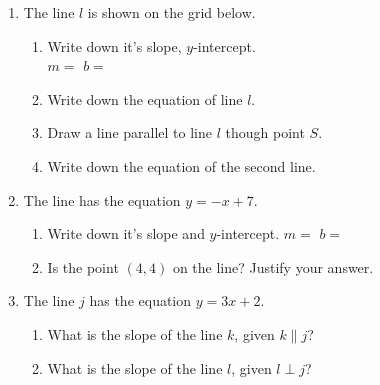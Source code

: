 \begin{enumerate}
\item The line $l$ is shown on the grid below.
\begin{multicols}{2}
\begin{enumerate}
  \item Write down it's slope, $y$-intercept.\\ $m=$
  \hspace{2cm} $b=$
  \vspace{0.25cm}
  \item Write down the equation of line $l$.
  \vspace{1cm}
  \item Draw a line parallel to line $l$ though point $S$.
  \item Write down the equation of the second line.
\end{enumerate}
  \begin{center}
  \end{center}
\end{multicols}\vspace{0.5cm}

\item The line has the equation $y=-x+7$. 
\begin{enumerate}
  \item Write down it's slope and $y$-intercept. \hspace{2cm} $m=$
  \hspace{2cm} $b=$
  \item Is the point $(4, 4)$ on the line? Justify your answer.
\end{enumerate}
\vspace{2cm}

\newpage
\item The line $j$ has the equation $y= 3x+2$.
  \begin{enumerate}
    \item What is the slope of the line $k$, given $k \parallel j$?
    \vspace{1cm}
    \item What is the slope of the line $l$, given $l \perp j$?
    \vspace{1cm}
  \end{enumerate}


\end{enumerate}

